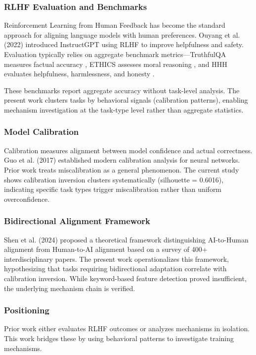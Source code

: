 
\subsubsection{RLHF Evaluation and Benchmarks}

Reinforcement Learning from Human Feedback has become the standard approach for aligning language models with human preferences. Ouyang et al. (2022) introduced InstructGPT using RLHF to improve helpfulness and safety. Evaluation typically relies on aggregate benchmark metrics---TruthfulQA measures factual accuracy \citep{lin2022truthfulqa}, ETHICS assesses moral reasoning \citep{hendrycks2021ethics}, and HHH evaluates helpfulness, harmlessness, and honesty \citep{askell2021general}.

These benchmarks report aggregate accuracy without task-level analysis. The present work clusters tasks by behavioral signals (calibration patterns), enabling mechanism investigation at the task-type level rather than aggregate statistics.

\subsubsection{Model Calibration}

Calibration measures alignment between model confidence and actual correctness. Guo et al. (2017) established modern calibration analysis for neural networks. Prior work treats miscalibration as a general phenomenon. The current study shows calibration inversion clusters systematically (silhouette = 0.6016), indicating specific task types trigger miscalibration rather than uniform overconfidence.

\subsubsection{Bidirectional Alignment Framework}

Shen et al. (2024) proposed a theoretical framework distinguishing AI-to-Human alignment from Human-to-AI alignment based on a survey of 400+ interdisciplinary papers. The present work operationalizes this framework, hypothesizing that tasks requiring bidirectional adaptation correlate with calibration inversion. While keyword-based feature detection proved insufficient, the underlying mechanism chain is verified.

\subsubsection{Positioning}

Prior work either evaluates RLHF outcomes or analyzes mechanisms in isolation. This work bridges these by using behavioral patterns to investigate training mechanisms.
